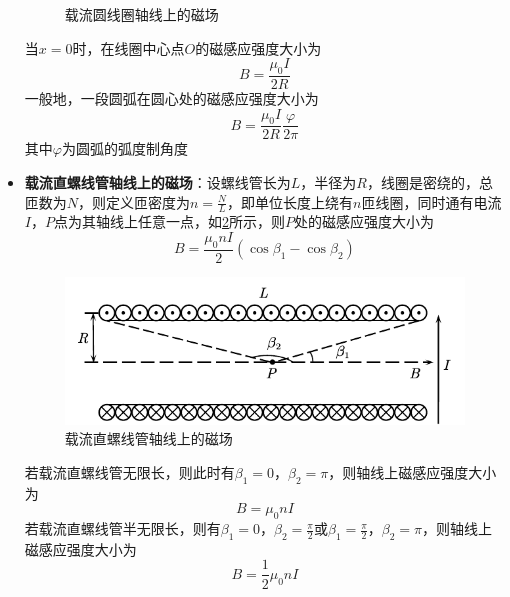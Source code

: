 \documentclass[12pt, a4paper, twoside]{ctexbook}
\begin{document}
\begin{itemize}
\begin{figure}[H]
        \caption{载流圆线圈轴线上的磁场}
        \label{fig:载流圆线圈轴线上的磁场}
    \end{figure}
    当$x=0$时，在线圈中心点$O$的磁感应强度大小为
    $$
    B=\frac{\mu_0 I}{2R}
    $$
    一般地，一段圆弧在圆心处的磁感应强度大小为
    $$
    B=\frac{\mu_0 I}{2R}\frac{\varphi}{2\pi}
    $$
    其中$\varphi$为圆弧的弧度制角度
    \item \textbf{载流直螺线管轴线上的磁场}：设螺线管长为$L$，半径为$R$，线圈是密绕的，总匝数为$N$，则定义匝密度为$n=\frac{N}{L}$，即单位长度上绕有$n$匝线圈，同时通有电流$I$，$P$点为其轴线上任意一点，如\textcolor{blue}{\cref{fig:载流直螺线管轴线上的磁场}}所示，则$P$处的磁感应强度大小为
    $$
    B=\frac{\mu_0nI}{2}\left(\cos\beta_1-\cos\beta_2\right)
    $$
    \begin{figure}[H]
        \centerline{\includegraphics[scale=1.0]{载流直螺线管轴线上的磁场.pdf}}
        \caption{载流直螺线管轴线上的磁场}
        \label{fig:载流直螺线管轴线上的磁场}
    \end{figure}
    若载流直螺线管无限长，则此时有$\beta_1=0$，$\beta_2=\pi$，则轴线上磁感应强度大小为
    $$
    B=\mu_0nI
    $$
    若载流直螺线管半无限长，则有$\beta_1=0$，$\beta_2=\frac{\pi}{2}$或$\beta_1=\frac{\pi}{2}$，$\beta_2=\pi$，则轴线上磁感应强度大小为
    $$
    B=\frac{1}{2}\mu_0nI
    $$
\end{itemize}
\end{document}
